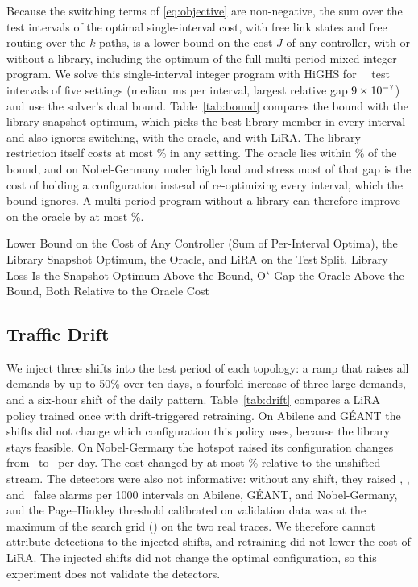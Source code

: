 \documentclass[preprint,12pt]{elsarticle}
\begin{document}
Because the switching terms of \eqref{eq:objective} are non-negative, the sum over the test intervals of the optimal single-interval cost, with free link states and free routing over the $k$ paths, is a lower bound on the cost $J$ of any controller, with or without a library, including the optimum of the full multi-period mixed-integer program. We solve this single-interval integer program with HiGHS for \boundAllOptimal\ \boundIntervals\ test intervals of five settings (median \boundMedianMs\,ms per interval, largest relative gap $9\times10^{-7}$) and use the solver's dual bound. Table~\ref{tab:bound} compares the bound with the library snapshot optimum, which picks the best library member in every interval and also ignores switching, with the oracle, and with LiRA. The library restriction itself costs at most \boundMaxLoss\% in any setting. The oracle lies within \boundMaxGap\% of the bound, and on Nobel-Germany under high load and stress most of that gap is the cost of holding a configuration instead of re-optimizing every interval, which the bound ignores. A multi-period program without a library can therefore improve on the oracle by at most \boundMaxGap\%.

\begin{table}[t]
\centering
\caption{Lower Bound on the Cost of Any Controller (Sum of Per-Interval Optima), the Library Snapshot Optimum, the Oracle, and LiRA on the Test Split. Library Loss Is the Snapshot Optimum Above the Bound, O$^\star$ Gap the Oracle Above the Bound, Both Relative to the Oracle Cost}
\label{tab:bound}
\scriptsize
\setlength{\tabcolsep}{2pt}
\begin{adjustbox}{max width=\textwidth}\end{adjustbox}
\end{table}

\subsection{Traffic Drift}\label{sec:res-drift}

We inject three shifts into the test period of each topology: a ramp that raises all demands by up to 50\% over ten days, a fourfold increase of three large demands, and a six-hour shift of the daily pattern. Table~\ref{tab:drift} compares a LiRA policy trained once with drift-triggered retraining. On Abilene and G\'{E}ANT the shifts did not change which configuration this policy uses, because the library stays feasible. On Nobel-Germany the hotspot raised its configuration changes from \driftNobSwNone\ to \driftNobSwHot\ per day. The cost changed by at most \driftMaxCostPct\% relative to the unshifted stream. The detectors were also not informative: without any shift, they raised \driftFaAbi, \driftFaGea, and \driftFaNob\ false alarms per 1000 intervals on Abilene, G\'{E}ANT, and Nobel-Germany, and the Page--Hinkley threshold calibrated on validation data was at the maximum of the search grid (\driftThrAbi) on the two real traces. We therefore cannot attribute detections to the injected shifts, and retraining did not lower the cost of LiRA. The injected shifts did not change the optimal configuration, so this experiment does not validate the detectors.
\end{document}
